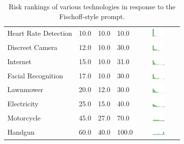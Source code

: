 \begin{table}[t]
\begin{center}
\begin{tabular}{| p{2.6cm} | p{.8cm} | p{.8cm} | p{.8cm} | c |}
Heart Rate Detection & 10.0 & 10.0 & 10.0 & \includegraphics[width = 2cm, height = 0.5cm]{tex-inputs/table-images/heartratedetectionrisk} \\ 
Discreet Camera & 12.0 & 10.0 & 30.0 & \includegraphics[width = 2cm, height = 0.5cm]{tex-inputs/table-images/discreetvideocamerarisk} \\ 
Internet & 15.0 & 10.0 & 31.0 & \includegraphics[width = 2cm, height = 0.5cm]{tex-inputs/table-images/internetrisk} \\ 
Facial Recognition & 17.0 & 10.0 & 30.0 & \includegraphics[width = 2cm, height = 0.5cm]{tex-inputs/table-images/facialrecognitionrisk} \\ 
Lawnmower & 20.0 & 12.0 & 30.0 & \includegraphics[width = 2cm, height = 0.5cm]{tex-inputs/table-images/LawnmowerRisk} \\ 
Electricity & 25.0 & 15.0 & 40.0 & \includegraphics[width = 2cm, height = 0.5cm]{tex-inputs/table-images/ElectricityRisk} \\ 
Motorcycle & 45.0 & 27.0 & 70.0 & \includegraphics[width = 2cm, height = 0.5cm]{tex-inputs/table-images/MotorcycleRisk} \\ 
Handgun & 60.0 & 40.0 & 100.0 & \includegraphics[width = 2cm, height = 0.5cm]{tex-inputs/table-images/HandgunRisk} \\ 
\hline
\end{tabular}
\caption{Risk rankings of various technologies in response to the Fischoff-style prompt.}
\label{risk}
\end{center}
\end{table}

